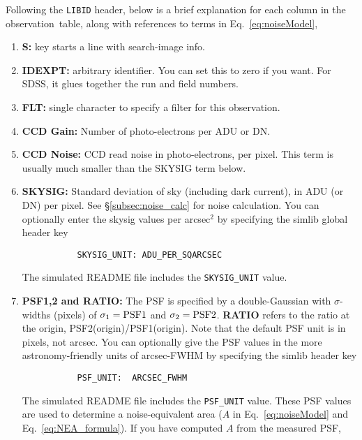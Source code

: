 \documentclass[12pt]{article}
\newcommand{\obs}{observation}
\begin{document}
{%
Following the {\tt LIBID} header,
below is a brief explanation for each column in the \obs\ table,
along with references to terms in Eq.~\ref{eq:noiseModel},
\begin{enumerate}
%
  \item  {\bf S:} key starts a line with search-image info.
%
  \item {\bf IDEXPT:} arbitrary identifier. You can set this to zero 
        if you want. For SDSS, it glues together the run and field numbers.
%
  \item {\bf FLT:} single character to specify a filter for this observation.
%
  \item {\bf CCD Gain:} Number of photo-electrons per ADU or DN.
%
  \item {\bf CCD Noise:} CCD read noise in photo-electrons, per pixel.
        This term is usually much smaller than the SKYSIG term below.
%
  \item {\bf SKYSIG:}  Standard deviation of sky (including dark current), 
        in ADU (or DN) per pixel.
        See \S\ref{subsec:noise_calc} for noise calculation.
	You can optionally enter the skysig values per arcsec$^2$ 
	by specifying the simlib global header key 
        \vspace{-0.4cm}
	\begin{verbatim} 
           SKYSIG_UNIT: ADU_PER_SQARCSEC 
	\end{verbatim} 
        \vspace{-0.4cm}
	The simulated README file includes the {\tt SKYSIG\_UNIT}
	value.
%
  \item {\bf PSF1,2 and RATIO:} The PSF is specified by a double-Gaussian
         with $\sigma$-widths (pixels) of 
	 $\sigma_1 = {\rm PSF1}$ and 
	 $\sigma_2 = {\rm PSF2}$.
	 {\bf RATIO} refers to the ratio at the origin,
	 PSF2(origin)/PSF1(origin). Note that the default PSF unit
	 is in pixels, not arcsec. You can optionally give the PSF 
	 values in the more astronomy-friendly units of arcsec-FWHM 
	 by specifying the simlib header key
        \vspace{-0.4cm}
	\begin{verbatim} 
           PSF_UNIT:  ARCSEC_FWHM
	\end{verbatim} 
        \vspace{-0.4cm}
	The simulated README file includes the {\tt PSF\_UNIT} value.
	These PSF values are used to determine a noise-equivalent
	area ($A$ in Eq.~\ref{eq:noiseModel} and Eq.~\ref{eq:NEA_formula}). 
	If you have computed $A$ from the measured PSF, 

\end{enumerate}}
\end{document}
